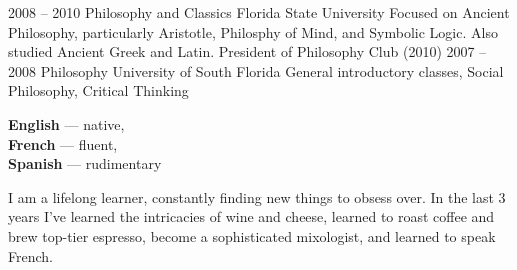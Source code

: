 \documentclass[9pt]{developercv} %
\begin{document}


\begin{entrylist}
    \entry
        {2008 -- 2010}
        {Philosophy and Classics}
        {Florida State University}
        {Focused on Ancient Philosophy, particularly Aristotle, Philosphy of
        Mind, and Symbolic Logic. Also studied Ancient Greek and Latin.
        President of Philosophy Club (2010)}
    \entry
        {2007 -- 2008}
        {Philosophy}
        {University of South Florida}
        {General introductory classes, Social Philosophy, Critical Thinking}
\end{entrylist}

%
\begin{minipage}[t]{0.2\textwidth}
    \vspace{-\baselineskip} %


        \textbf{English} — native,\\
        \textbf{French} — fluent,\\
        \textbf{Spanish} — rudimentary

\end{minipage}
\hfill
\begin{minipage}[t]{0.7\textwidth}
    \vspace{-\baselineskip} %


    I am a lifelong learner, constantly finding new things to obsess over. In
    the last 3 years I've learned the intricacies of wine and cheese, learned to
    roast coffee and brew top-tier espresso, become a sophisticated mixologist,
    and learned to speak French.
\end{minipage}
%
%

\end{document}
